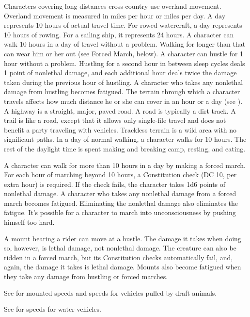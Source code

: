 Characters covering long distances cross-country use overland movement. Overland movement is measured in miles per hour or miles per day. A day represents 10 hours of actual travel time. For rowed watercraft, a day represents 10 hours of rowing. For a sailing ship, it represents 24 hours.
 A character can walk 10 hours in a day of travel without a problem. Walking for longer than that can wear him or her out (see Forced March, below).
 A character can hustle for 1 hour without a problem. Hustling for a second hour in between sleep cycles deals 1 point of nonlethal damage, and each additional hour deals twice the damage taken during the previous hour of hustling. A character who takes any nonlethal damage from hustling becomes fatigued.
 The terrain through which a character travels affects how much distance he or she can cover in an hour or a day (see ). A highway is a straight, major, paved road. A road is typically a dirt track. A trail is like a road, except that it allows only single-file travel and does not benefit a party traveling with vehicles. Trackless terrain is a wild area with no significant paths.
 In a day of normal walking, a character walks for 10 hours. The rest of the daylight time is spent making and breaking camp, resting, and eating.

A character can walk for more than 10 hours in a day by making a forced march. For each hour of marching beyond 10 hours, a Constitution check (DC 10,  per extra hour) is required. If the check fails, the character takes 1d6 points of nonlethal damage. A character who takes any nonlethal damage from a forced march becomes fatigued. Eliminating the nonlethal damage also eliminates the fatigue. It's possible for a character to march into unconsciousness by pushing himself too hard.

 A mount bearing a rider can move at a hustle. The damage it takes when doing so, however, is lethal damage, not nonlethal damage. The creature can also be ridden in a forced march, but its Constitution checks automatically fail, and, again, the damage it takes is lethal damage. Mounts also become fatigued when they take any damage from hustling or forced marches.

See  for mounted speeds and speeds for vehicles pulled by draft animals.

 See  for speeds for water vehicles.

